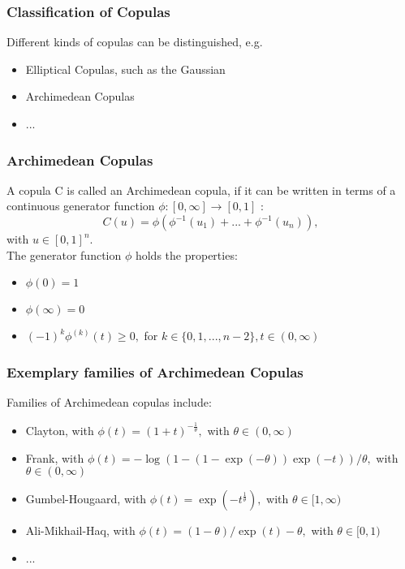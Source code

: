 \documentclass{beamer}
\begin{document}
\frame{\sectionpage}

\begin{frame}
\frametitle{Classification of Copulas}

Different kinds of copulas can be distinguished, e.g.
\begin{itemize}
\item{Elliptical Copulas, such as the Gaussian}
\item{Archimedean Copulas}
\item{...}
\end{itemize}
\end{frame}


\begin{frame}
\frametitle{Archimedean Copulas}

A copula C is called an Archimedean copula, if it can be written in terms of a continuous generator function $\phi: [0, \infty] \rightarrow [0, 1]$ : 
\[C(u) = \phi (\phi ^{-1}(u_1)+ ... + \phi ^{-1}(u_n)),\]
with $u \in [0, 1]^n$. \\

The generator function $\phi$ holds the properties:

\begin{itemize}
\item{$\phi (0) = 1$}
\item{$\phi (\infty) = 0$}
\item{$(-1)^k \phi ^{(k)}(t) \geq 0,$ for $k \in \{0, 1, ..., n-2\}, t\in (0, \infty)$}
\end{itemize}
\end{frame}


\begin{frame}
\frametitle{Exemplary families of Archimedean Copulas}

Families of Archimedean copulas include:
\begin{itemize}
\item{Clayton, with $\phi(t) = (1 + t)^{-\frac{1}{\theta}},$ with $\theta \in (0, \infty)$}
\item{Frank, with $\phi(t) = -\log{(1-(1- \exp{(-\theta)})\exp{(-t)})}/\theta,$ with $\theta \in (0, \infty)$}
\item{Gumbel-Hougaard, with $\phi(t) = \exp{(-t^{\frac{1}{\theta}})},$ with $\theta \in [1, \infty)$}
\item{Ali-Mikhail-Haq, with $\phi(t) = (1-\theta)/\exp{(t)}-\theta,$ with $\theta \in [0, 1)$}
\item{...}
\end{itemize}

\end{frame}
\end{document}
